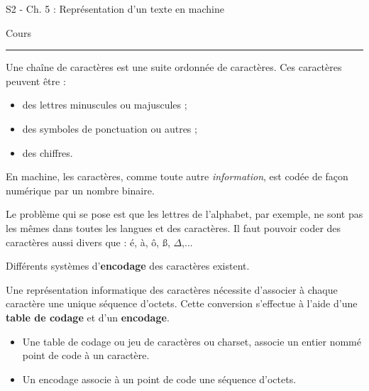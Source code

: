 \documentclass[11pt,a4paper]{article}
\renewcommand{\emph}{\textit}
\providecommand{\tightlist}{\setlength{\itemsep}{0pt}\setlength{\parskip}{0pt}}
\newenvironment{info}[1]{\begin{tcolorbox}[title= {\color{ProcessBlue} \faBook}~~\textbf{#1}, colframe=ProcessBlue, colback=white, colbacktitle=ProcessBlue!15!white, coltitle=black, boxrule=0.1mm, titlerule=0mm]}{\end{tcolorbox}}
\begin{document}
    
    
     
    \chead{} 
    \cfoot{}
    \renewcommand{\headrulewidth}{0pt}
    \renewcommand{\footrulewidth}{0pt}
    
    \Huge S2 - Ch. 5 : Représentation d'un texte en machine  

    \vspace{.25cm}
    \normalsize Cours  
    
    \vspace{.25cm}
    \hrule
    
    \vspace{.5cm}


Une chaîne de caractères est une suite ordonnée de caractères. Ces
caractères peuvent être :

\begin{itemize}
\tightlist
\item
  des lettres minuscules ou majuscules ;
\item
  des symboles de ponctuation ou autres ;
\item
  des chiffres.
\end{itemize}

En machine, les caractères, comme toute autre \emph{information}, est
codée de façon numérique par un nombre binaire.

Le problème qui se pose est que les lettres de l'alphabet, par exemple,
ne sont pas les mêmes dans toutes les langues et des caractères. Il faut
pouvoir coder des caractères aussi divers que : é, à, ô, \ss{}, \(\Delta\),...

Différents systèmes d'\textbf{encodage} des caractères existent.

\begin{info}{À retenir}
   Une représentation informatique des caractères nécessite
d'associer à chaque caractère une unique séquence d'octets. Cette
conversion s'effectue à l'aide d'une \textbf{table de codage} et d'un
\textbf{encodage}.

\begin{itemize}
\tightlist
\item
  Une table de codage ou jeu de caractères ou charset, associe un entier
  nommé point de code à un caractère.
\item
  Un encodage associe à un point de code une séquence d'octets.
\end{itemize}
\end{info}
\end{document}
